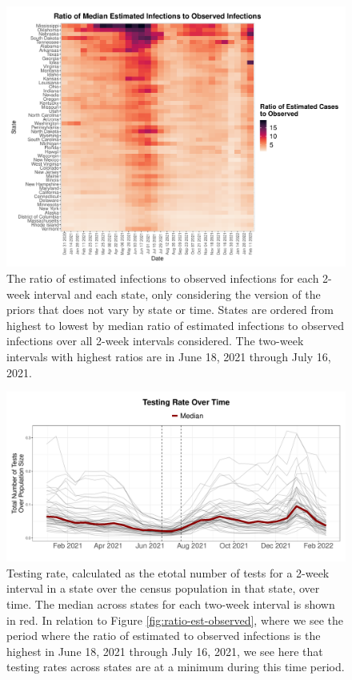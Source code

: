 \documentclass[12pt,twoside]{smiththesis}
\begin{document}
~

~

~

~

~

~

~

~

~

~

~
\begin{figure}
\includegraphics[width=1\linewidth]{figure/heatmap_ratio_est_observed} \caption{\label{fig:ratio-est-observed} The ratio of estimated infections to observed infections for each 2-week interval and each state, only considering the version of the priors that does not vary by state or time. States are ordered from highest to lowest by median ratio of estimated infections to observed infections over all 2-week intervals considered. The two-week intervals with highest ratios are in June 18, 2021 through July 16, 2021.}\label{fig:unnamed-chunk-72}
\end{figure}
\begin{figure}
\includegraphics[width=0.8\linewidth]{figure/testrate-low-summer} \caption{\label{fig:test-low-summer}Testing rate, calculated as the etotal number of tests for a 2-week interval in a state over the census population in that state, over time. The median across states for each two-week interval is shown in red. In relation to Figure \ref{fig:ratio-est-observed}, where we see the period where the ratio of estimated to observed infections is the highest in June 18, 2021 through July 16, 2021, we see here that testing rates across states are at a minimum during this time period.}\label{fig:unnamed-chunk-73}
\end{figure}
\end{document}
